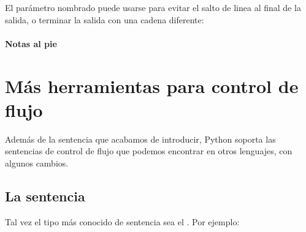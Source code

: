 \documentclass[a5paper,10pt,spanish]{sphinxmanual}
\begin{document}
\begin{itemize}
\begin{sphinxVerbatim}[commandchars=\\\{\}]
  
 
\end{sphinxVerbatim}

\sphinxAtStartPar
El parámetro nombrado  puede usarse para evitar el salto de linea al final de la salida, o terminar la salida con una cadena diferente:

\begin{sphinxVerbatim}[commandchars=\\\{\}]
    
   
     
        
\end{sphinxVerbatim}

\end{itemize}
\subsubsection*{Notas al pie}


\chapter{Más herramientas para control de flujo}
\label{\detokenize{tutorial/controlflow:more-control-flow-tools}}\label{\detokenize{tutorial/controlflow:tut-morecontrol}}\label{\detokenize{tutorial/controlflow::doc}}
\sphinxAtStartPar
Además de la sentencia  que acabamos de introducir, Python soporta las sentencias de control de flujo que podemos encontrar en otros lenguajes, con algunos cambios.


\section{La sentencia }
\label{\detokenize{tutorial/controlflow:if-statements}}\label{\detokenize{tutorial/controlflow:tut-if}}
\sphinxAtStartPar
Tal vez el tipo más conocido de sentencia sea el . Por ejemplo:
\end{document}
